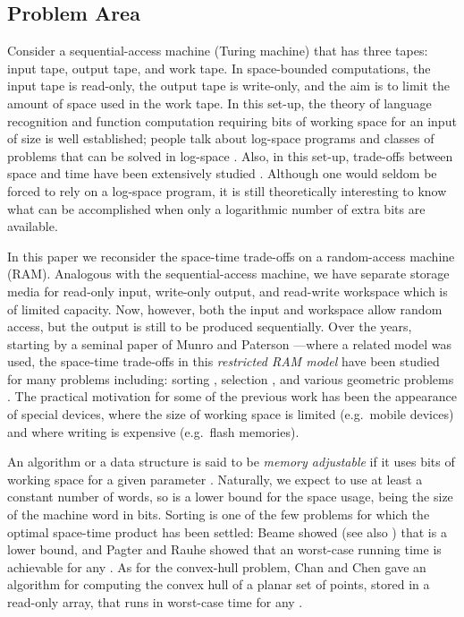 \documentclass[final,onetabnum,onefignum,onethmnum]{siamltex}
\begin{document}
\subsection{Problem Area}  Consider a sequential-access machine (Turing
machine) that has three tapes: input tape, output tape, and work
tape. In space-bounded computations, the input tape is read-only, the
output tape is write-only, and the aim is to limit the amount of space
used in the work tape. In this set-up, the theory of language
recognition and function computation requiring  bits of
working space for an input of size  is well established; people
talk about log-space programs \cite[Section 3.9.3]{Sav08} and classes
of problems that can be solved in log-space \cite[Section
  8.5.3]{Sav08}. Also, in this set-up, trade-offs between space and
time have been extensively studied \cite[Chapter 10]{Sav08}.  Although
one would seldom be forced to rely on a log-space program, it is still
theoretically interesting to know what can be accomplished when only a
logarithmic number of extra bits are available.

In this paper we reconsider the space-time trade-offs on a
random-access machine (RAM).  Analogous with the sequential-access
machine, we have separate storage media for read-only input, write-only
output, and read-write workspace which is of limited capacity.  Now,
however, both the input and workspace allow random access, but the
output is still to be produced sequentially.  Over the years, starting
by a seminal paper of Munro and Paterson \cite{MP80}---where a related
model was used, the space-time trade-offs in this \emph{restricted RAM
  model} have been studied for many problems including: sorting
\cite{Fre87,PR98}, selection \cite{EJKS14,Fre87}, and various
geometric problems \cite{ABBKMRS11,BKLSS15,DNR12,DNR15}.  The practical
motivation for some of the previous work has been the appearance of
special devices, where the size of working space is limited
(e.g.~mobile devices) and where writing is expensive (e.g.~flash
memories).

An algorithm or a data structure is said to be \emph{memory
  adjustable} if it uses  bits of working space for a given
parameter .  Naturally, we expect to use at least a constant number of words, 
so  is a lower bound for the space usage,  being the size
of the machine word in bits. Sorting is one of the few problems for
which the optimal space-time product has been settled: Beame showed
\cite{Bea91} (see also \cite[Theorem 10.13.8]{Sav08}) that
 is a lower bound, and Pagter and Rauhe showed
\cite{PR98} that an  worst-case running time is
achievable for any .
As for the convex-hull problem, Chan and Chen \cite{CC07} gave an
algorithm for computing the convex hull of a planar set of  points,
stored in a read-only array, that runs in  worst-case time for any .
\end{document}
